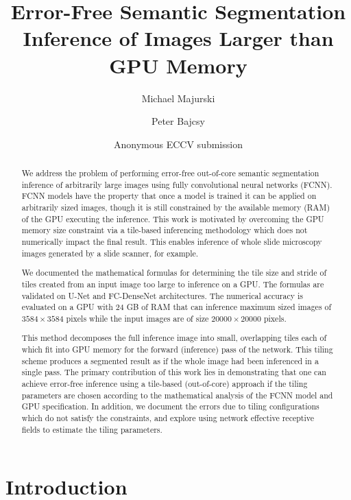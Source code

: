 \documentclass[runningheads]{llncs}
\title{Error-Free Semantic Segmentation Inference of Images Larger than GPU Memory}
\author{Michael Majurski\inst{1} \and Peter Bajcsy\inst{1}}
\institute{National Institute of Standards and Technology\\
	Information Technology Lab\\
	Gaithersburg, MD 20899, USA\\
	\email{\{michael.majurski,peter.bajcsy\}@nist.gov}}
\author{Anonymous ECCV submission}
\institute{Paper ID \ECCVSubNumber}
\begin{document}
\maketitle
 
\begin{abstract}

We address the problem of performing error-free out-of-core semantic segmentation inference of arbitrarily large images using fully convolutional neural networks (FCNN). FCNN models have the property that once a model is trained it can be applied on arbitrarily sized images, though it is still constrained by the available memory (RAM) of the GPU executing the inference. This work is motivated by overcoming the GPU memory size constraint via a tile-based inferencing methodology which does not numerically impact the final result. This enables inference of whole slide microscopy images generated by a slide scanner, for example.

We documented the mathematical formulas for determining the tile size and stride of tiles created from an input image too large to inference on a GPU. The formulas are validated on U-Net and FC-DenseNet architectures.
The numerical accuracy is evaluated on a GPU with 24 GB of RAM that can inference maximum sized images of $\num{3584} \times \num{3584}$ pixels while the input images are of size $\num{20000} \times \num{20000}$ pixels. 

This method decomposes the full inference image into small, overlapping tiles each of which fit into GPU memory for the forward (inference) pass of the network. 
This tiling scheme produces a segmented result as if the whole image had been inferenced in a single pass. 
The primary contribution of this work lies in demonstrating that one can achieve error-free inference using a tile-based (out-of-core) approach if the tiling parameters are chosen according to the mathematical analysis of the FCNN model and GPU specification. 
In addition, we document the errors due to tiling configurations which do not satisfy the constraints, and explore using network effective receptive fields to estimate the tiling parameters. 

\end{abstract}

\section{Introduction}
\end{document}
